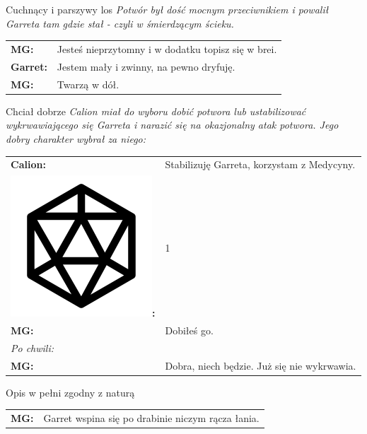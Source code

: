 \documentclass[10pt,twoside,twocolumn]{book}
\begin{document}
\begin{rpg-quotebox}{Cuchnący i parszywy los}
   \textit{Potwór był dość mocnym przeciwnikiem i powalił Garreta tam gdzie stał - czyli w śmierdzącym ścieku.}\\
   
   \begin{tabularx}{\columnwidth}{lX}
      \textbf{MG:} & Jesteś nieprzytomny i w dodatku topisz się w brei.\\
      \textbf{Garret:} & Jestem mały i zwinny, na pewno dryfuję.\\
      \textbf{MG:} & Twarzą w dół.\\
   \end{tabularx}
\end{rpg-quotebox}

\begin{rpg-quotebox}{Chciał dobrze}
\textit{Calion miał do wyboru dobić potwora lub ustabilizować wykrwawiającego się Garreta i narazić się na okazjonalny atak potwora. Jego dobry charakter wybrał za niego:}\\
   
   \begin{tabularx}{\columnwidth}{lX}
      \textbf{Calion:} & Stabilizuję Garreta, korzystam z Medycyny.\\
      \includegraphics[scale=0.06]{img/d20.png}\textbf{:}& 1\\
      \textbf{MG:} & Dobiłeś go.\\
      \multicolumn{2}{l}{\textit{Po chwili:}}\\
      \textbf{MG:} & Dobra, niech będzie. Już się nie wykrwawia.\\
   \end{tabularx}
\end{rpg-quotebox}

\begin{rpg-quotebox}{Opis w pełni zgodny z naturą}
   \begin{tabularx}{\columnwidth}{lX}
   \textbf{MG:} & Garret wspina się po drabinie niczym rącza łania.\\
   \end{tabularx}
\end{rpg-quotebox}
\end{document}

